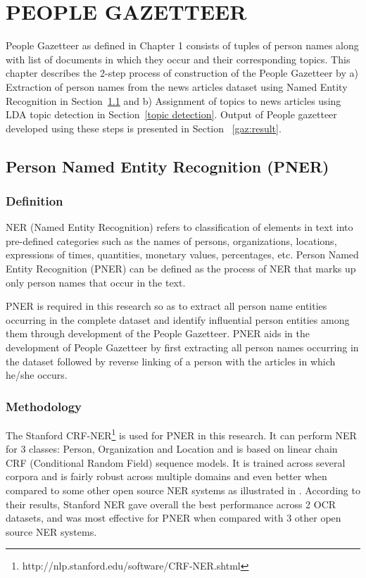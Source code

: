 \chapter{PEOPLE GAZETTEER}
\label{chapter:people gazetteer}

People Gazetteer as defined in Chapter 1 consists of tuples of person names along with list of documents in which they occur and their corresponding topics. This chapter describes the 2-step process of construction of the People Gazetteer by
a) Extraction of person names from the news articles dataset using Named Entity Recognition in  Section~\ref{ner} and
b) Assignment of topics to news articles using LDA topic detection in  Section~\ref{topic detection}.
Output of People gazetteer developed using these steps is presented in Section ~\ref{gaz:result}.

\section{Person Named Entity Recognition (PNER)}
\label{ner}


\subsection{Definition}
NER (Named Entity Recognition) refers to classification of elements in text into pre-defined categories such as the names of persons, organizations, locations, expressions of times, quantities, monetary values, percentages, etc. 
Person Named Entity Recognition (PNER) can be defined as the process of NER that marks up only person names that occur in the text.

PNER is required in this research so as to extract all person name entities occurring in the complete dataset and identify influential person entities among them through development of the People Gazetteer. 
PNER aids in the development of People Gazetteer by first extracting all person names occurring in the dataset followed by reverse linking of a person with the articles in which he/she occurs.

\subsection{Methodology}

The Stanford CRF-NER\footnote{http://nlp.stanford.edu/software/CRF-NER.shtml} is used for PNER in this research. It can perform NER for 3 classes: Person, Organization and Location and is based on linear chain CRF (Conditional Random Field) sequence models. It is trained across several corpora and is fairly robust across multiple domains and even better when compared to some other open source NER systems as illustrated in \cite{rodriquez2012comparison}. According to their results, Stanford NER gave overall the best performance across 2 OCR datasets, and was most effective for PNER when compared with 3 other open source NER systems.


